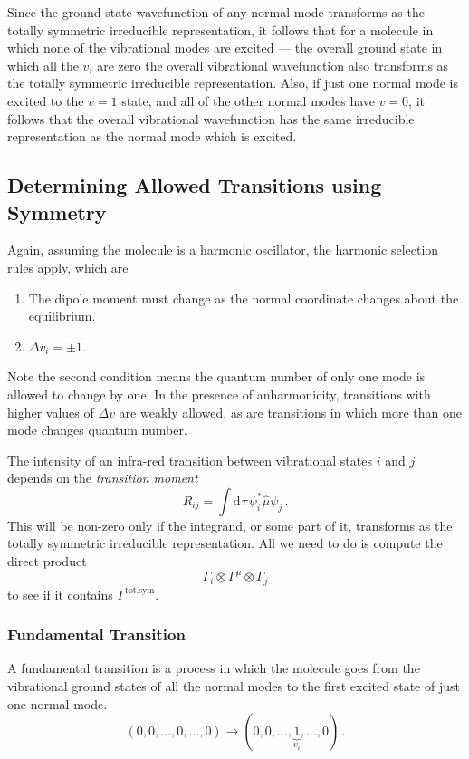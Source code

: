 \documentclass{article}
\theoremstyle{plain}\theoremheaderfont{\normalfont\itshape}\theorembodyfont{\rmfamily}\theoremseparator{.}\newtheorem*{rem}{Remark}\newtheorem*{ex}{Example}\newtheorem*{proof}{Proof}\newtheorem*{altp}{Alternative proof}
\theoremstyle{plain}\theoremheaderfont{\normalfont\bfseries}\theorembodyfont{\rmfamily}\theoremseparator{.}\newtheorem{thm}{Theorem}[section]\newtheorem{lem}[thm]{Lemma}\newtheorem{prop}[thm]{Proposition}\newtheorem*{cor}{Corollary}\newtheorem{defn}[thm]{Definition}\newtheorem{clm}[thm]{Claim}\newtheorem{clminproof}{Claim}\newtheorem{pos}{Postulate}[section]
\theoremstyle{break}\theoremheaderfont{\normalfont\itshape}\theorembodyfont{\rmfamily}\theoremseparator{.\medskip}\newtheorem*{proofskip}{Proof}\newtheorem*{exs}{Examples}\newtheorem*{rems}{Remarks}
\theoremstyle{break}\theoremheaderfont{\normalfont\bfseries}\theorembodyfont{\rmfamily}\theoremseparator{.\medskip}\newtheorem{lemskip}[thm]{Lemma}\newtheorem{defnskip}[thm]{Definition}\newtheorem{propskip}[thm]{Proposition}\newtheorem{thmskip}[thm]{Theorem}
\numberwithin{equation}{section}
\newcommand{\dd}[2][]{\mathrm{d}^{#1} #2\,}
\begin{document}
    Since the ground state wavefunction of any normal mode transforms as the totally symmetric irreducible representation, it follows that for a molecule in which none of the vibrational modes are excited --- the overall ground state in which all the \(v_i\) are zero the overall vibrational wavefunction also transforms as the totally symmetric irreducible representation. Also, if just one normal mode is excited to the \(v=1\) state, and all of the other normal modes have \(v=0\), it follows that the overall vibrational wavefunction has the same irreducible representation as the normal mode which is excited.
    
    \subsection{Determining Allowed Transitions using Symmetry}
    Again, assuming the molecule is a harmonic oscillator, the harmonic selection rules apply, which are
    \begin{enumerate}[topsep=0pt,label=(\roman*)]
        \item The dipole moment must change as the normal coordinate changes about the equilibrium.
        \item \(\Delta v_i=\pm 1\).
    \end{enumerate}
    Note the second condition means the quantum number of only one mode is allowed to change by one. In the presence of anharmonicity, transitions with higher values of \(\Delta v\) are weakly allowed, as are transitions in which more than one mode changes quantum number.

    The intensity of an infra-red transition between vibrational states \(i\) and \(j\) depends on the \textit{transition moment}
    \begin{equation}
        R_{ij}=\int\dd{\tau}\psi_i^*\hat{\mu}\psi_j\,.
    \end{equation}
    This will be non-zero only if the integrand, or some part of it, transforms as the totally symmetric irreducible representation. All we need to do is compute the direct product
    \begin{equation}
        \Gamma_i\otimes\Gamma^\mu\otimes\Gamma_j
    \end{equation}
    to see if it contains \(\Gamma^{\text{tot.sym}}\).

    \subsubsection{Fundamental Transition}
    A fundamental transition is a process in which the molecule goes from the vibrational ground states of all the normal modes to the first excited state of just one normal mode.
    \begin{equation}
        (0,0,\dots,0,\dots,0)\to(0,0,\dots,\underbrace{1}_{v_i},\dots,0)\,.
    \end{equation}
\end{document}
